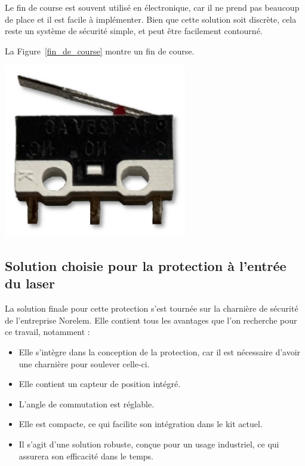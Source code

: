 \begin{minipage}[c]{0.6\textwidth}
    Le fin de course est souvent utilisé en électronique, car il ne prend pas beaucoup de place et il est facile à implémenter. Bien que cette solution soit discrète, cela reste un système de sécurité simple, et peut être facilement contourné.

    La Figure~\ref{fin_de_course} montre un fin de course.
\end{minipage}\hfill
\begin{minipage}[c]{0.35\textwidth}
    \begin{center}
        \includegraphics[width=0.6\textwidth]{assets/figures/Protections_laser/Securite_electrique/fin_de_course.png}
    \end{center}
    \label{fin_de_course}
\end{minipage}

\newpage
\subsection{Solution choisie pour la protection à l'entrée du laser}
La solution finale pour cette protection s'est tournée sur la charnière de sécurité de l'entreprise Norelem. Elle contient tous les avantages que l'on recherche pour ce travail, notamment :
\begin{itemize}[label=\textbullet]
    \item Elle s'intègre dans la conception de la protection, car il est nécessaire d'avoir une charnière pour soulever celle-ci.
    \item Elle contient un capteur de position intégré.
    \item L'angle de commutation est réglable.
    \item Elle est compacte, ce qui facilite son intégration dans le kit actuel.
    \item Il s'agit d'une solution robuste, conçue pour un usage industriel, ce qui assurera son efficacité dans le temps.
\end{itemize}

